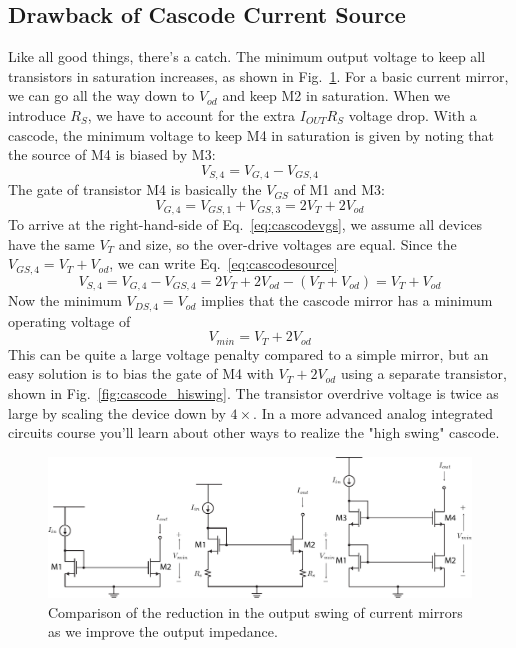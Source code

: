 \subsection{Drawback of Cascode Current Source}
Like all good things, there's a catch.  The minimum output voltage to keep all transistors in saturation increases, as shown in Fig.~\ref{fig:mirrors_vmin}.  For a basic current mirror, we can go all the way down to $V_{od}$ and keep M2 in saturation.  When we introduce $R_S$, we have to account for the extra $I_{OUT} R_S$ voltage drop.  With a cascode, the minimum voltage to keep M4 in saturation is given by noting that the source of M4 is biased by M3:
    \begin{equation}
        V_{S,4} = V_{G,4} - V_{GS,4}
        \label{eq:cascodesource}
    \end{equation}
The gate of transistor M4 is basically the $V_{GS}$ of M1 and M3:
    \begin{equation}
        V_{G,4} = V_{GS,1} + V_{GS,3} = 2 V_T + 2 V_{od}
        \label{eq:cascodevgs}
    \end{equation}
To arrive at the right-hand-side of Eq.~\ref{eq:cascodevgs}, we assume all devices have the same $V_T$ and size, so the over-drive voltages are equal.  Since the $V_{GS,4} = V_T + V_{od}$, we can write Eq.~\ref{eq:cascodesource}
    \begin{equation}
        V_{S,4} = V_{G,4} - V_{GS,4}   = 2 V_T + 2 V_{od} - ( V_T + V_{od} ) = V_T + V_{od}
    \end{equation}
Now the minimum $V_{DS,4} = V_{od}$ implies that the cascode mirror has a minimum operating voltage of
    \begin{equation}
        V_{min} = V_T + 2 V_{od}
    \end{equation}
This can be quite a large voltage penalty compared to a simple mirror, but an easy solution is to bias the gate of M4 with $V_T + 2 V_{od}$ using a separate transistor, shown in Fig.~\ref{fig:cascode_hiswing}.  The transistor overdrive voltage is twice as large by scaling the device down by $4\times$.  In a more advanced analog integrated circuits course you'll learn about other ways to realize the "high swing" cascode.
\begin{figure}[tb]
\centering
\includegraphics[width=\columnwidth]{mirrors_vmin}
\caption{Comparison of the reduction in the output swing of current mirrors as we improve the output impedance.}
\label{fig:mirrors_vmin}
\end{figure}
